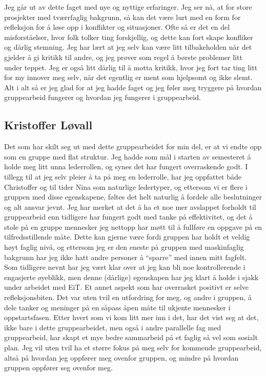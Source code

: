 Jeg går ut av dette faget med nye og nyttige erfaringer. Jeg ser nå, at for store prosjekter med tværrfaglig bakgrunn, så kan det være lurt med en form for refleksjon for å løse opp i konflikter og situasjoner. 
Ofte så er det en del misforståelser, hvor folk tolker ting forskjellig, og dette kan fort skape konfliker og dårlig stemning.
Jeg har lært at jeg selv kan være litt tilbakeholden når det gjelder å gi kritikk til andre, og jeg prøver som regel å børste problemer litt under teppet.
Jeg er også litt dårlig til å motta kritikk, hvor jeg fort tar ting litt for my innover meg selv, når det egentlig er ment som hjelpsomt og ikke slemt.
Alt i alt så er jeg glad for at jeg hadde faget og jeg føler meg tryggere på hvordan gruppearbeid fungerer og hvordan jeg fungerer i gruppearbeid.

\subsection*{Kristoffer Løvall}
Det som har skilt seg ut med dette gruppearbeidet for min del, er at vi endte opp som en gruppe med flat struktur. Jeg hadde som mål i starten av 
semesteret å holde meg litt unna lederrollen, og synes det har fungert overraskende godt. I tillegg til at jeg selv pleier å ta på meg en lederrolle, har 
jeg oppfattet både Christoffer og til tider Nina som naturlige ledertyper, og ettersom vi er flere i gruppen med disse egenskapene, føltes det helt 
naturlig å fordele alle beslutninger og alt ansvar jevnt. Jeg har merket at det å ha et noe mer avslappet forholdt til gruppearbeid enn tidligere har 
fungert godt med tanke på effektivitet, og det å stole på en gruppe mennesker jeg nettopp har møtt til å fullføre en oppgave på en 
tilfredsstillende måte. Dette kan gjerne være fordi gruppen har holdt et veldig høyt faglig nivå, og ettersom jeg er den eneste på gruppen med 
maskinfaglig bakgrunn har jeg ikke hatt andre personer å “sparre” med innen mitt fagfelt. Som tidligere nevnt har jeg vært klar over at jeg kan bli 
noe kontrollerende i engasjerte øyeblikk, men denne (dårlige) egenskapen har jeg klart å holde i sjakk under arbeidet med EiT. Et annet aspekt som 
har overrasket positivt er selve refleksjonsbiten. Det var uten tvil en utfordring for meg, og andre i gruppen, å dele tanker og meninger på en 
såpass åpen måte til ukjente mennesker i oppstartsfasen. Etter hvert som vi kom litt mer inn i det, har det vist seg at det, ikke bare i dette 
gruppearbeidet, men også i andre parallelle fag med gruppearbeid, har skapt et mye bedre sammarbeid på et faglig så vel som sosialt plan. Jeg vil 
uten tvil ha et større fokus på meg selv for kommende gruppearbeid, altså på hvordan jeg oppfører meg ovenfor gruppen, og mindre på hvordan 
gruppen oppfører seg ovenfor meg.

